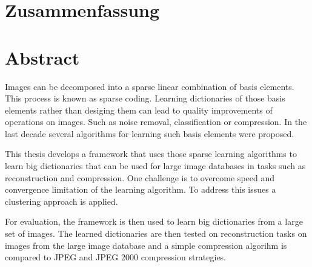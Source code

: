 \newpage
{}
{}
\chapter*{Zusammenfassung}
\thispagestyle{empty}

\newpage
{}
{}
\chapter*{Abstract}
\thispagestyle{empty}

Images can be decomposed into a sparse linear combination of basis
elements. This process is known as sparse coding. Learning dictionaries of
those basis elements rather than desiging them can lead to quality improvements
of operations on images. Such as noise removal, classification or compression.
In the last decade several algorithms for learning such basis elements were
proposed.

This thesis develops a framework that uses those sparse learning algorithms to
learn big dictionaries that can be used for large image databases in tasks
such as reconstruction and compression. One challenge is to overcome speed and
convergence limitation of the learning algorithm. To address this issues a
clustering approach is applied. 

For evaluation, the framework is then used to learn big dictionaries from a
large set of images. The learned dictionaries are then tested on reconstruction
tasks on images from the large image database and a simple compression algorihm
is compared to JPEG and JPEG 2000 compression strategies.



